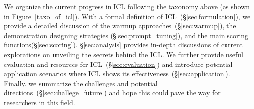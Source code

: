

We organize the current progress in ICL following the taxonomy above (as shown in Figure~\ref{taxo_of_icl}). 
With a formal definition of ICL~(\S\ref{sec:formulation}), 
we provide a detailed discussion of the warmup approaches~(\S\ref{sec:warmup}), the demonstration designing strategies (\S\ref{sec:prompt_tuning}), and the main scoring functions(\S\ref{sec:scoring}). \S\ref{sec:analysis} provides in-depth discussions of current explorations on unveiling the secrets behind the ICL. 
We further provide useful evaluation and resources for ICL~(\S\ref{sec:evaluation}) and introduce potential application scenarios where ICL shows its effectiveness~(\S\ref{sec:application}).
Finally, we summarize the challenges and potential directions~(\S\ref{sec:challege_future}) and hope this could pave the way for researchers in this field.


